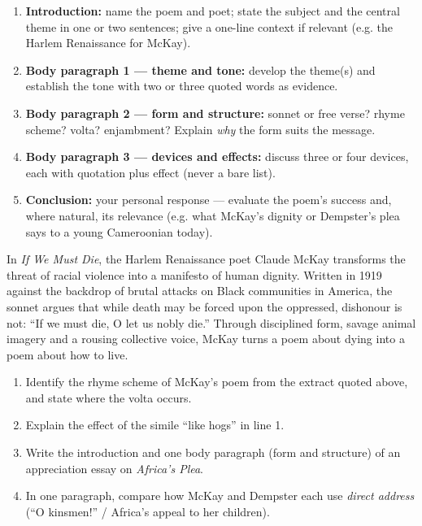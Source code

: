 \documentclass[11pt]{article}
\begin{document}
\begin{methode}
\begin{enumerate}
\item \textbf{Introduction:} name the poem and poet; state the subject and the central theme in one or two sentences; give a one-line context if relevant (e.g. the Harlem Renaissance for McKay).
\item \textbf{Body paragraph 1 — theme and tone:} develop the theme(s) and establish the tone with two or three quoted words as evidence.
\item \textbf{Body paragraph 2 — form and structure:} sonnet or free verse? rhyme scheme? volta? enjambment? Explain \emph{why} the form suits the message.
\item \textbf{Body paragraph 3 — devices and effects:} discuss three or four devices, each with quotation plus effect (never a bare list).
\item \textbf{Conclusion:} your personal response — evaluate the poem's success and, where natural, its relevance (e.g. what McKay's dignity or Dempster's plea says to a young Cameroonian today).
\end{enumerate}
\end{methode}

\begin{exemplebox}
In \emph{If We Must Die}, the Harlem Renaissance poet Claude McKay transforms the threat of racial violence into a manifesto of human dignity. Written in 1919 against the backdrop of brutal attacks on Black communities in America, the sonnet argues that while death may be forced upon the oppressed, dishonour is not: ``If we must die, O let us nobly die.'' Through disciplined form, savage animal imagery and a rousing collective voice, McKay turns a poem about dying into a poem about how to live.
\end{exemplebox}

\begin{exercice}
\begin{enumerate}
\item Identify the rhyme scheme of McKay's poem from the extract quoted above, and state where the volta occurs.
\item Explain the effect of the simile ``like hogs'' in line 1.
\item Write the introduction and one body paragraph (form and structure) of an appreciation essay on \emph{Africa's Plea}.
\item In one paragraph, compare how McKay and Dempster each use \emph{direct address} (``O kinsmen!'' / Africa's appeal to her children).
\end{enumerate}
\end{exercice}
\end{document}
